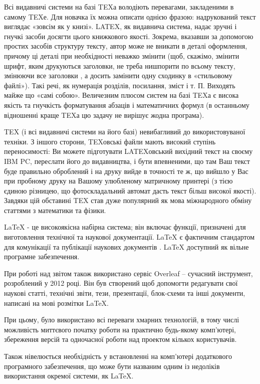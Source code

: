 Всі видавничі системи на базі TEXа володіють перевагами, закладеними в самому TEXе. Для новачка їх можна описати однією фразою: надрукований текст виглядає «зовсім як у книзі». LATEX, як видавнича система, надає зручні і гнучкі засоби досягти цього книжкового якості. Зокрема, вказавши за допомогою простих засобів структуру тексту, автор може не вникати в деталі оформлення, причому ці деталі при необхідності неважко змінити (щоб, скажімо, змінити шрифт, яким друкуються заголовки, не треба нишпорити по всьому тексту, змінюючи все заголовки , а досить замінити одну сходинку в «стильовому файлі»). Такі речі, як нумерація розділів, посилання, зміст і т. П. Виходять майже що «самі собою». Величезним плюсом систем на базі TEXа є висока якість та гнучкість форматування абзаців і математичних формул (в останньому відношенні краще TEXа цю задачу не вирішує жодна програма).

TEX (і всі видавничі системи на його базі) невибагливий до використовуваної техніки. З іншого сторони, TEXовські файли мають високий ступінь переносимості: Ви можете підготувати LATEXовський вихідний текст на своєму IBM PC, переслати його до видавництва, і бути впевненими, що там Ваш текст буде правильно оброблений і на друку вийде в точності те ж, що вийшло у Вас при пробному друку на Вашому улюбленому матричному принтері (з тією єдиною різницею, що фотоскладальний автомат дасть текст більш високої якості). Завдяки цій обставині TEX став дуже популярний як мова міжнародного обміну статтями з математики та фізики.

LaTeX - це високоякісна набірна система; він включає функції, призначені для виготовлення технічної та наукової документації. LaTeX є фактичним стандартом для комунікації та публікації наукових документів \cite{lamport1994latex}. LaTeX доступний як вільне програмне забезпечення.

При роботі над звітом також використано сервіс Overleaf -- сучасний інструмент, розроблений у 2012 році. Він був створений щоб допомогти редагувати свої наукові статті, технічні звіти, тези, презентації, блок-схеми та інші документи, написані на мові розмітки LaTeX. 

При цьому, було використано всі переваги хмарних технологій, в тому числі можливість миттєвого початку роботи на практично будь-якому комп'ютері, збереження версій та одночасної роботи над проектом кількох користувачів.

Також нівелюється необхідність у встановленні на комп'ютері додаткового програмного забезпечення, що може бути названим одним із недоліків використання окремої системи, як LaTeX.

